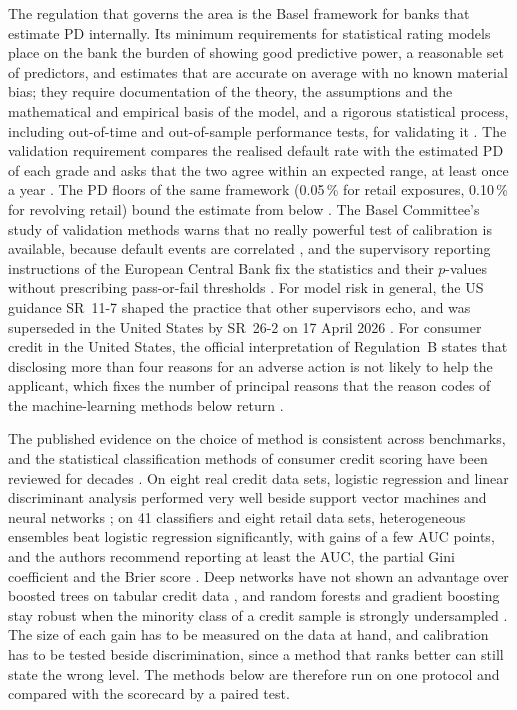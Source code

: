 The regulation that governs the area is the Basel framework for banks that estimate PD internally. Its minimum requirements for
statistical rating models place on the bank the burden of showing good predictive power, a reasonable set of predictors, and
estimates that are accurate on average with no known material bias; they require documentation of the theory, the assumptions and
the mathematical and empirical basis of the model, and a rigorous statistical process, including out-of-time and out-of-sample
performance tests, for validating it \citep{credit-scoring:bcbscre36}. The validation requirement compares the realised default
rate with the estimated PD of each grade and asks that the two agree within an expected range, at least once a year
\citep{credit-scoring:bcbscre36}. The PD floors of the same framework (0.05\,\% for retail exposures, 0.10\,\% for revolving
retail) bound the estimate from below \citep{credit-scoring:bcbscre32}. The Basel Committee's study of validation methods warns
that no really powerful test of calibration is available, because default events are correlated
\citep{credit-scoring:bcbswp14}, and the supervisory reporting instructions of the European Central Bank fix the statistics and
their $p$-values without prescribing pass-or-fail thresholds \citep{credit-scoring:ecb2019}. For model risk in general, the US
guidance SR~11-7 \citep{credit-scoring:sr117} shaped the practice that other supervisors echo, and was superseded in the United
States by SR~26-2 on 17 April 2026 \citep{credit-scoring:sr262}. For consumer credit in the United States, the official
interpretation of Regulation~B states that disclosing more than four reasons for an adverse action is not likely to help the
applicant, which fixes the number of principal reasons that the reason codes of the machine-learning methods below return
\citep{credit-scoring:regb}.

The published evidence on the choice of method is consistent across benchmarks, and the statistical classification methods of
consumer credit scoring have been reviewed for decades \citep{credit-scoring:handhenley1997}. On eight real credit data sets, logistic
regression and linear discriminant analysis performed very well beside support vector machines and neural networks
\citep{credit-scoring:baesens2003}; on 41 classifiers and eight retail data sets, heterogeneous ensembles beat logistic regression
significantly, with gains of a few AUC points, and the authors recommend reporting at least the AUC, the partial Gini coefficient
and the Brier score \citep{credit-scoring:lessmann2015}. Deep networks have not shown an advantage over boosted trees on tabular
credit data \citep{credit-scoring:gunnarsson2021,credit-scoring:grinsztajn2022}, and random forests and gradient boosting stay
robust when the minority class of a credit sample is strongly undersampled \citep{credit-scoring:brown2012}. The size of each gain has to be measured on the
data at hand, and calibration has to be tested beside discrimination, since a method that ranks better can still state the wrong
level. The methods below are therefore run on one protocol and compared with the scorecard by a paired test.

